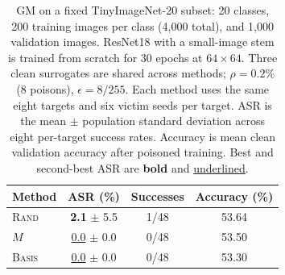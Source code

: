 \begin{table}[t]
\centering
\caption{GM on a fixed TinyImageNet-20 subset: 20 classes, 200 training images per class (4,000 total), and 1,000 validation images. ResNet18 with a small-image stem is trained from scratch for 30 epochs at $64\times64$. Three clean surrogates are shared across methods; $\rho=0.2\%$ (8 poisons), $\epsilon=8/255$. Each method uses the same eight targets and six victim seeds per target. ASR is the mean $\pm$ population standard deviation across eight per-target success rates. Accuracy is mean clean validation accuracy after poisoned training. Best and second-best ASR are \textbf{bold} and \underline{underlined}.}
\label{tab:tinyimagenet20-gm}
\vspace{-0.5em}
\small
\begin{tabular}{@{}lccc@{}}
\toprule
\textbf{Method} & ASR (\%) & Successes & Accuracy (\%) \\
\midrule
\textsc{Rand} & \textbf{2.1} $\pm$ 5.5 & 1/48 & 53.64 \\
$M$ & \underline{0.0} $\pm$ 0.0 & 0/48 & 53.50 \\
\textsc{Basis} & \underline{0.0} $\pm$ 0.0 & 0/48 & 53.30 \\
\bottomrule
\end{tabular}
\vspace{-0.5em}
\end{table}
